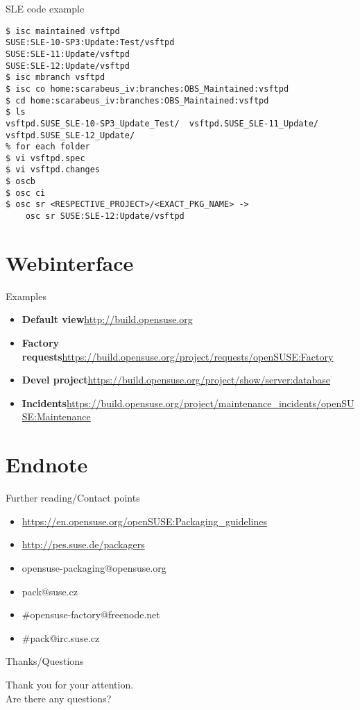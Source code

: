 \documentclass{beamer}
\begin{document}
\begin{frame}[fragile]{SLE code example}
	\begin{tiny}
	\begin{verbatim}
$ isc maintained vsftpd
SUSE:SLE-10-SP3:Update:Test/vsftpd
SUSE:SLE-11:Update/vsftpd
SUSE:SLE-12:Update/vsftpd
$ isc mbranch vsftpd
$ isc co home:scarabeus_iv:branches:OBS_Maintained:vsftpd
$ cd home:scarabeus_iv:branches:OBS_Maintained:vsftpd
$ ls
vsftpd.SUSE_SLE-10-SP3_Update_Test/  vsftpd.SUSE_SLE-11_Update/ vsftpd.SUSE_SLE-12_Update/
% for each folder
$ vi vsftpd.spec
$ vi vsftpd.changes
$ oscb
$ osc ci
$ osc sr <RESPECTIVE_PROJECT>/<EXACT_PKG_NAME> ->
	osc sr SUSE:SLE-12:Update/vsftpd
	\end{verbatim}
	\end{tiny}
\end{frame}

\section{Webinterface}

\begin{frame}{Examples}
	\begin{itemize}
	\item{\textbf{Default view}\newline \url{http://build.opensuse.org}}
	\item{\textbf{Factory requests}\newline \url{https://build.opensuse.org/project/requests/openSUSE:Factory}}
	\item{\textbf{Devel project}\newline \url{https://build.opensuse.org/project/show/server:database}}
	\item{\textbf{Incidents}\newline \url{https://build.opensuse.org/project/maintenance\_incidents/openSUSE:Maintenance}}
	\end{itemize}
\end{frame}

\section{Endnote}

\begin{frame}[t]{Further reading/Contact points}
	\begin{itemize}
	\item \url{https://en.opensuse.org/openSUSE:Packaging\_guidelines}
	\item \url{http://pes.suse.de/packagers}
	\item opensuse-packaging@opensuse.org
	\item pack@suse.cz
	\item \#opensuse-factory@freenode.net 
	\item \#pack@irc.suse.cz
	\end{itemize}
\end{frame}

\begin{frame}{Thanks/Questions}
	\begin{center}
	Thank you for your attention.\\
	Are there any questions?
	\end{center}
\end{frame}
\end{document}
